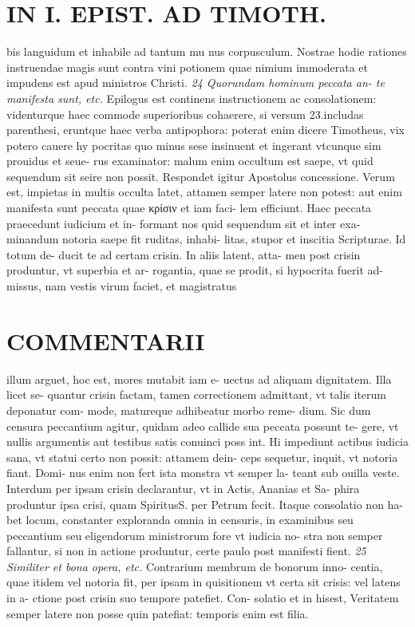 \documentclass{article}
\begin{document}
\begin{pages}
\section*{IN I. EPIST. AD TIMOTH. }
\marginpar{[ p.141 ]}\pstart bis languidum et inhabile ad tantum mu nus corpusculum. Nostrae hodie rationes instruendae magis sunt contra vini potionem quae nimium immoderata et impudens est apud ministros Christi.  \pend
\textit{24 Quorundam hominum peccata an- te manifesta sunt, etc. }\pstart Epilogus est continens instructionem ac consolationem: videnturque haec commode superioribus cohaerere, si versum 23.includas parenthesi, eruntque haec verba antipophora: poterat enim dicere Timotheus, vix potero cauere hy pocritas quo minus sese insinuent et ingerant vtcunque sim prouidus et seue- rus examinator: malum enim occultum est saepe, vt quid sequendum sit seire non possit. Respondet igitur Apostolus concessione. Verum est, impietas in multis occulta latet, attamen semper latere non potest: aut enim manifesta sunt peccata quae κρίσιν et iam faci- lem efficiunt.  \pend\pstart Haec peccata praecedunt iudicium et in- formant nos quid sequendum sit et inter exa- minandum notoria saepe fit ruditas, inhabi- litas, stupor et inscitia Scripturae. Id totum de- ducit te ad certam crisin. In aliis latent, atta- men post crisin produntur, vt superbia et ar- rogantia, quae se prodit, si hypocrita fuerit ad- missus, nam vestis virum faciet, et magistratus  \pend
\marginpar{[ p.142 ]}
\section*{COMMENTARII }\pstart illum arguet, hoc est, mores mutabit iam e- uectus ad aliquam dignitatem. Illa licet se- quantur crisin factam, tamen correctionem admittant, vt talis iterum deponatur com- mode, matureque adhibeatur morbo reme- dium. Sic dum censura peccantium agitur, quidam adeo callide sua peccata possunt te- gere, vt nullis argumentis aut testibus satis conuinci poss int. Hi impediunt actibus iudicia sana, vt statui certo non possit: attamem dein- ceps sequetur, inquit, vt notoria fiant. Domi- nus enim non fert ista monstra vt semper la- teant sub ouilla veste. Interdum per ipsam crisin declarantur, vt in Actis, Ananias et Sa- phira produntur ipsa crisi, quam SpiritusS. per Petrum fecit. Itaque consolatio non ha- bet locum, constanter exploranda omnia in censuris, in examinibus seu peccantium seu eligendorum ministrorum fore vt iudicia no- stra non semper fallantur, si non in actione produntur, certe paulo post manifesti fient.  \pend
\textit{25 Similiter et bona opera, etc. }\pstart Contrarium membrum de bonorum inno- centia, quae itidem vel notoria fit, per ipsam in quisitionem vt certa sit crisis: vel latens in a- ctione post crisin suo tempore patefiet. Con- solatio et in hisest, Veritatem semper latere non posse quin patefiat: temporis enim est filia.  \pend

\end{pages}
\end{document}
